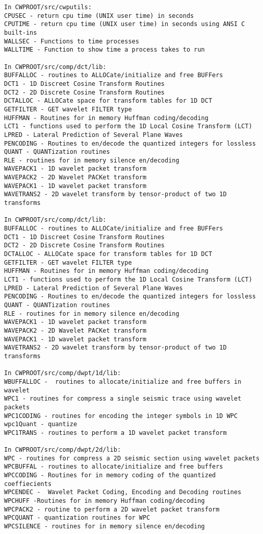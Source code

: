 {{\begin{verbatim}
In CWPROOT/src/cwputils:
CPUSEC - return cpu time (UNIX user time) in seconds
CPUTIME - return cpu time (UNIX user time) in seconds using ANSI C built-ins
WALLSEC - Functions to time processes
WALLTIME - Function to show time a process takes to run

In CWPROOT/src/comp/dct/lib:
BUFFALLOC - routines to ALLOCate/initialize and free BUFFers
DCT1 - 1D Discreet Cosine Transform Routines
DCT2 - 2D Discrete Cosine Transform Routines
DCTALLOC - ALLOCate space for transform tables for 1D DCT
GETFILTER - GET wavelet FILTER type
HUFFMAN - Routines for in memory Huffman coding/decoding
LCT1 - functions used to perform the 1D Local Cosine Transform (LCT)
LPRED - Lateral Prediction of Several Plane Waves
PENCODING - Routines to en/decode the quantized integers for lossless 
QUANT - QUANTization routines
RLE - routines for in memory silence en/decoding
WAVEPACK1 - 1D wavelet packet transform
WAVEPACK2 - 2D Wavelet PACKet transform 
WAVEPACK1 - 1D wavelet packet transform
WAVETRANS2 - 2D wavelet transform by tensor-product of two 1D transforms

In CWPROOT/src/comp/dct/lib:
BUFFALLOC - routines to ALLOCate/initialize and free BUFFers
DCT1 - 1D Discreet Cosine Transform Routines
DCT2 - 2D Discrete Cosine Transform Routines
DCTALLOC - ALLOCate space for transform tables for 1D DCT
GETFILTER - GET wavelet FILTER type
HUFFMAN - Routines for in memory Huffman coding/decoding
LCT1 - functions used to perform the 1D Local Cosine Transform (LCT)
LPRED - Lateral Prediction of Several Plane Waves
PENCODING - Routines to en/decode the quantized integers for lossless 
QUANT - QUANTization routines
RLE - routines for in memory silence en/decoding
WAVEPACK1 - 1D wavelet packet transform
WAVEPACK2 - 2D Wavelet PACKet transform 
WAVEPACK1 - 1D wavelet packet transform
WAVETRANS2 - 2D wavelet transform by tensor-product of two 1D transforms

In CWPROOT/src/comp/dwpt/1d/lib:
WBUFFALLOC -  routines to allocate/initialize and free buffers in wavelet
WPC1 - routines for compress a single seismic trace using wavelet packets 
WPC1CODING - routines for encoding the integer symbols in 1D WPC 
wpc1Quant - quantize
WPC1TRANS - routines to perform a 1D wavelet packet transform 

In CWPROOT/src/comp/dwpt/2d/lib:
WPC - routines for compress a 2D seismic section using wavelet packets 
WPCBUFFAL - routines to allocate/initialize and free buffers
WPCCODING - Routines for in memory coding of the quantized coeffiecients
WPCENDEC -  Wavelet Packet Coding, Encoding and Decoding routines
WPCHUFF -Routines for in memory Huffman coding/decoding
WPCPACK2 - routine to perform a 2D wavelet packet transform 
WPCQUANT - quantization routines for WPC
WPCSILENCE - routines for in memory silence en/decoding


\end{verbatim}}}

